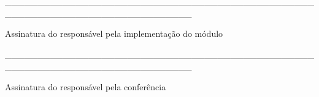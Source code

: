 \documentclass[a4paper]{article}
\begin{document}
\begin{flushright}
\_\_\_\_\_\_\_\_\_\_\_\_\_\_\_\_\_\_\_\_\_\_\_\_\_\_\_\_\_\_\_\_\_\_\_\_\_\_\_\_\_\_\_\_\_\_\_\_\_\_\_\_\_\_\_\_\_\_\_\_\_\_\_\_\_\_\_\_\_\_\_\_\_\_\_\_\_

Assinatura do responsável pela implementação do módulo
\end{flushright}

\begin{flushright}

\end{flushright}

\begin{flushright}
\_\_\_\_\_\_\_\_\_\_\_\_\_\_\_\_\_\_\_\_\_\_\_\_\_\_\_\_\_\_\_\_\_\_\_\_\_\_\_\_\_\_\_\_\_\_\_\_\_\_\_\_\_\_\_\_\_\_\_\_\_\_\_\_\_\_\_\_\_\_\_\_\_\_\_\_\_

Assinatura do responsável pela conferência
\end{flushright}
\end{document}
